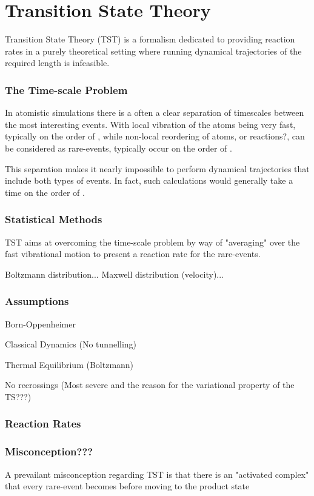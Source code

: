\section{Transition State Theory}
\label{sec:tst}

Transition State Theory (TST) is a formalism dedicated to providing reaction rates in a purely theoretical setting where running dynamical trajectories of the required length is infeasible.

\recent

\incomplete

\subsubsection{The Time-scale Problem}
In atomistic simulations there is a often a clear separation of timescales between the most interesting events.
With local vibration of the atoms being very fast, typically on the order of \missing,
while non-local reordering of atoms, or reactions?, can be considered as rare-events, typically occur on the order of \missing.

This separation makes it nearly impossible to perform dynamical trajectories that include both types of events.
In fact, such calculations would generally take a time on the order of \missing.

\recent

\incomplete

\subsubsection{Statistical Methods}
TST aims at overcoming the time-scale problem by way of "averaging" over the fast vibrational motion to present a reaction rate for the rare-events.

Boltzmann distribution...
Maxwell distribution (velocity)...

\incomplete

\subsubsection{Assumptions}
\bit
\item Born-Oppenheimer
\item Classical Dynamics (No tunnelling)
\item Thermal Equilibrium (Boltzmann)
\item No recrossings (Most severe and the reason for the variational property of the TS???)
\eit
\placeholder

\subsubsection{Reaction Rates}
\placeholder

\subsubsection{Misconception???}
A prevailant misconception regarding TST is that there is an "activated complex" that every rare-event becomes before moving to the product state

\placeholder


